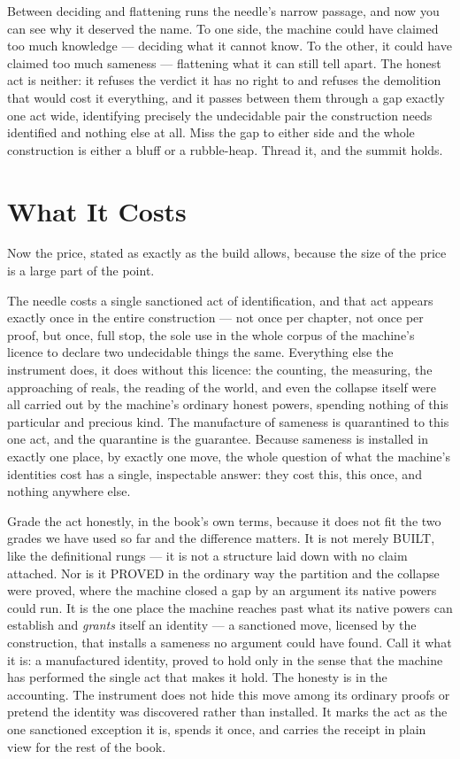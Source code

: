 Between deciding and flattening runs the needle's narrow passage, and now you can see why it deserved the name. To
one side, the machine could have claimed too much knowledge --- deciding what it cannot know. To the other, it
could have claimed too much sameness --- flattening what it can still tell apart. The honest act is neither: it
refuses the verdict it has no right to and refuses the demolition that would cost it everything, and it passes
between them through a gap exactly one act wide, identifying precisely the undecidable pair the construction needs
identified and nothing else at all. Miss the gap to either side and the whole construction is either a bluff or a
rubble-heap. Thread it, and the summit holds.

\section{What It Costs}

Now the price, stated as exactly as the build allows, because the size of the price is a large part of the point.

The needle costs a single sanctioned act of identification, and that act appears exactly once in the entire
construction --- not once per chapter, not once per proof, but once, full stop, the sole use in the whole corpus
of the machine's licence to declare two undecidable things the same. Everything else the instrument does, it does
without this licence: the counting, the measuring, the approaching of reals, the reading of the world, and even
the collapse itself were all carried out by the machine's ordinary honest powers, spending nothing of this
particular and precious kind. The manufacture of sameness is quarantined to this one act, and the quarantine is
the guarantee. Because sameness is installed in exactly one place, by exactly one move, the whole question of what
the machine's identities cost has a single, inspectable answer: they cost this, this once, and nothing anywhere
else.

Grade the act honestly, in the book's own terms, because it does not fit the two grades we have used so far and
the difference matters. It is not merely BUILT, like the definitional rungs --- it is not a structure laid down
with no claim attached. Nor is it PROVED in the ordinary way the partition and the collapse were proved, where the
machine closed a gap by an argument its native powers could run. It is the one place the machine reaches past what
its native powers can establish and \emph{grants} itself an identity --- a sanctioned move, licensed by the
construction, that installs a sameness no argument could have found. Call it what it is: a manufactured identity,
proved to hold only in the sense that the machine has performed the single act that makes it hold. The honesty is
in the accounting. The instrument does not hide this move among its ordinary proofs or pretend the identity was
discovered rather than installed. It marks the act as the one sanctioned exception it is, spends it once, and
carries the receipt in plain view for the rest of the book.

